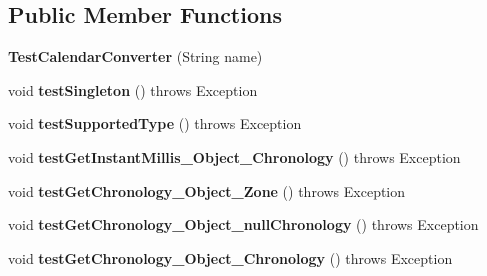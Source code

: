 \subsection*{Public Member Functions}
\begin{DoxyCompactItemize}
\item 
\hypertarget{classorg_1_1joda_1_1time_1_1convert_1_1_test_calendar_converter_a26e130d8fc9c3ab37179fd156e307f67}{{\bfseries Test\-Calendar\-Converter} (String name)}\label{classorg_1_1joda_1_1time_1_1convert_1_1_test_calendar_converter_a26e130d8fc9c3ab37179fd156e307f67}

\item 
\hypertarget{classorg_1_1joda_1_1time_1_1convert_1_1_test_calendar_converter_a2f00069b08907bc006b3d3a7d0857b22}{void {\bfseries test\-Singleton} ()  throws Exception }\label{classorg_1_1joda_1_1time_1_1convert_1_1_test_calendar_converter_a2f00069b08907bc006b3d3a7d0857b22}

\item 
\hypertarget{classorg_1_1joda_1_1time_1_1convert_1_1_test_calendar_converter_a39084d27224a3f83b6020a4f9277d153}{void {\bfseries test\-Supported\-Type} ()  throws Exception }\label{classorg_1_1joda_1_1time_1_1convert_1_1_test_calendar_converter_a39084d27224a3f83b6020a4f9277d153}

\item 
\hypertarget{classorg_1_1joda_1_1time_1_1convert_1_1_test_calendar_converter_acde24ad70f920232602c249080257a2b}{void {\bfseries test\-Get\-Instant\-Millis\-\_\-\-Object\-\_\-\-Chronology} ()  throws Exception }\label{classorg_1_1joda_1_1time_1_1convert_1_1_test_calendar_converter_acde24ad70f920232602c249080257a2b}

\item 
\hypertarget{classorg_1_1joda_1_1time_1_1convert_1_1_test_calendar_converter_ae657dbd65cc4122f62a23fc032ee223e}{void {\bfseries test\-Get\-Chronology\-\_\-\-Object\-\_\-\-Zone} ()  throws Exception }\label{classorg_1_1joda_1_1time_1_1convert_1_1_test_calendar_converter_ae657dbd65cc4122f62a23fc032ee223e}

\item 
\hypertarget{classorg_1_1joda_1_1time_1_1convert_1_1_test_calendar_converter_ac03a8cd03a869adb7628cdcf3f5a7d70}{void {\bfseries test\-Get\-Chronology\-\_\-\-Object\-\_\-null\-Chronology} ()  throws Exception }\label{classorg_1_1joda_1_1time_1_1convert_1_1_test_calendar_converter_ac03a8cd03a869adb7628cdcf3f5a7d70}

\item 
\hypertarget{classorg_1_1joda_1_1time_1_1convert_1_1_test_calendar_converter_a136d7b063530150fb889868a396a21bf}{void {\bfseries test\-Get\-Chronology\-\_\-\-Object\-\_\-\-Chronology} ()  throws Exception }\label{classorg_1_1joda_1_1time_1_1convert_1_1_test_calendar_converter_a136d7b063530150fb889868a396a21bf}


\end{DoxyCompactItemize}
